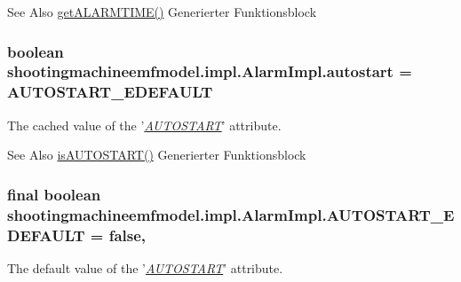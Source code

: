 \begin{DoxySeeAlso}{See Also}
\hyperlink{classshootingmachineemfmodel_1_1impl_1_1_alarm_impl_ac79556c6b3f364973719c580860200b3}{get\-A\-L\-A\-R\-M\-T\-I\-M\-E()} Generierter Funktionsblock  
\end{DoxySeeAlso}
\hypertarget{classshootingmachineemfmodel_1_1impl_1_1_alarm_impl_afc1bb0e74f4c4da81e00d2263997fb2f}{
\subsubsection[{autostart}]{\setlength{\rightskip}{0pt plus 5cm}boolean shootingmachineemfmodel.\-impl.\-Alarm\-Impl.\-autostart = {\bf A\-U\-T\-O\-S\-T\-A\-R\-T\-\_\-\-E\-D\-E\-F\-A\-U\-L\-T}\hspace{0.3cm}{\ttfamily [protected]}}}\label{classshootingmachineemfmodel_1_1impl_1_1_alarm_impl_afc1bb0e74f4c4da81e00d2263997fb2f}
The cached value of the '\hyperlink{classshootingmachineemfmodel_1_1impl_1_1_alarm_impl_abf52c0d2ad03e0367f3f315a4683c14f}{{\itshape A\-U\-T\-O\-S\-T\-A\-R\-T}}' attribute.

\begin{DoxySeeAlso}{See Also}
\hyperlink{classshootingmachineemfmodel_1_1impl_1_1_alarm_impl_abf52c0d2ad03e0367f3f315a4683c14f}{is\-A\-U\-T\-O\-S\-T\-A\-R\-T()} Generierter Funktionsblock  
\end{DoxySeeAlso}
\hypertarget{classshootingmachineemfmodel_1_1impl_1_1_alarm_impl_ae3645bdaa1939ee466b393bec08d2ad3}{
\subsubsection[{A\-U\-T\-O\-S\-T\-A\-R\-T\-\_\-\-E\-D\-E\-F\-A\-U\-L\-T}]{\setlength{\rightskip}{0pt plus 5cm}final boolean shootingmachineemfmodel.\-impl.\-Alarm\-Impl.\-A\-U\-T\-O\-S\-T\-A\-R\-T\-\_\-\-E\-D\-E\-F\-A\-U\-L\-T = false\hspace{0.3cm}{\ttfamily [static]}, {\ttfamily [protected]}}}\label{classshootingmachineemfmodel_1_1impl_1_1_alarm_impl_ae3645bdaa1939ee466b393bec08d2ad3}
The default value of the '\hyperlink{classshootingmachineemfmodel_1_1impl_1_1_alarm_impl_abf52c0d2ad03e0367f3f315a4683c14f}{{\itshape A\-U\-T\-O\-S\-T\-A\-R\-T}}' attribute.

